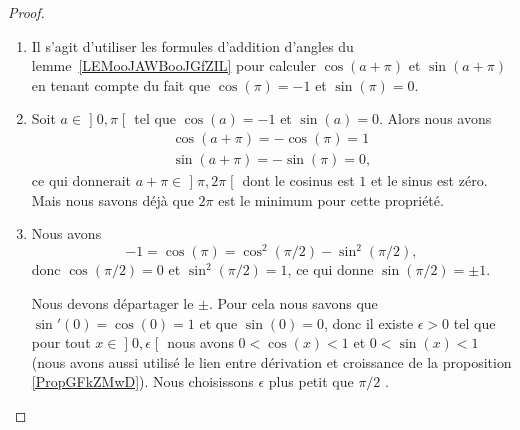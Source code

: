 \begin{proof}
\begin{enumerate}
		      Mais d'un autre côté, le nombre \( 2\pi\) est le plus petit \( T\) vérifiant \( \cos(T)=1\), \( \sin(T)=0\). Donc, avoir \( \cos(\pi)=1\) n'est pas possible. Nous concluons
		      \begin{subequations}
			      \begin{numcases}{}
				      \cos(\pi)=-1\\
				      \sin(\pi)=0.
			      \end{numcases}
		      \end{subequations}
		\item
		      Il s'agit d'utiliser les formules d'addition d'angles du lemme~\ref{LEMooJAWBooJGfZIL} pour calculer \( \cos(a+\pi)\) et \( \sin(a+\pi)\) en tenant compte du fait que \( \cos(\pi)=-1\) et \( \sin(\pi)=0\).
		\item
		      Soit \( a\in\mathopen] 0 , \pi \mathclose[\) tel que \( \cos(a)=-1\) et \( \sin(a)=0\). Alors nous avons
			      \begin{subequations}
				      \begin{align}
					      \cos(a+\pi)=-\cos(\pi)=1 \\
					      \sin(a+\pi)=-\sin(\pi)=0,
				      \end{align}
			      \end{subequations}
			      ce qui donnerait \( a+\pi\in\mathopen] \pi , 2\pi \mathclose[\) dont le cosinus est \( 1\) et le sinus est zéro. Mais nous savons déjà que \( 2\pi\) est le minimum pour cette propriété.
		\item
		      Nous avons
		      \begin{equation}
			      -1=\cos(\pi)=\cos^2(\pi/2)-\sin^2(\pi/2),
		      \end{equation}
		      donc \( \cos(\pi/2)=0\) et \( \sin^2(\pi/2)=1\), ce qui donne \( \sin(\pi/2)=\pm 1\).

		      Nous devons départager le \( \pm\). Pour cela nous savons que \( \sin'(0)=\cos(0)=1\) et que \( \sin(0)=0\), donc il existe \( \epsilon>0\) tel que pour tout \( x\in\mathopen] 0 , \epsilon \mathclose[\) nous avons \( 0<\cos(x)<1\) et \( 0<\sin(x)<1\) (nous avons aussi utilisé le lien entre dérivation et croissance de la proposition \ref{PropGFkZMwD}). Nous choisissons \( \epsilon\) plus petit que \( \pi/2\) .


\end{enumerate}
\end{proof}
